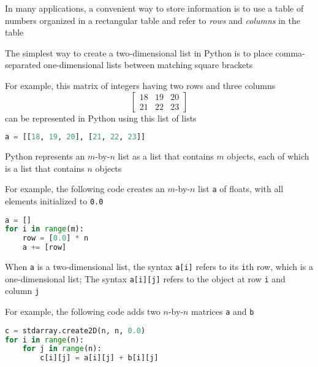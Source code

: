 \documentclass[8pt,a4paper,compress]{beamer}
\begin{document}
\begin{frame}[fragile]
In many applications, a convenient way to store information is to use a table of numbers organized in a rectangular table and refer to \emph{rows} and \emph{columns} in the table

\bigskip

The simplest way to create a two-dimensional list in Python is to place comma-separated one-dimensional lists between matching square brackets 

\bigskip

For example, this matrix of integers having two rows and three columns 
\[
\begin{bmatrix}
18 & 19 & 20 \\ 
21 & 22 & 23
\end{bmatrix}
\]
can be represented in Python using this list of lists
\begin{lstlisting}[language=Python]
a = [[18, 19, 20], [21, 22, 23]]
\end{lstlisting}

\bigskip

Python represents an $m$-by-$n$ list as a list that contains $m$ objects, each of which is a list that contains $n$ objects

\bigskip

For example, the following code creates an $m$-by-$n$ list \lstinline{a} of floats, with all elements initialized to \lstinline{0.0}
\begin{lstlisting}[language=Python]
a = []
for i in range(m):
    row = [0.0] * n
    a += [row]
\end{lstlisting}
\end{frame}

\begin{frame}[fragile]
When \lstinline{a} is a two-dimensional list, the syntax \lstinline{a[i]} refers to its \lstinline{i}th row, which is a one-dimensional list; The syntax \lstinline{a[i][j]} refers to the object at row \lstinline{i} and column \lstinline{j}

\bigskip

For example, the following code adds two $n$-by-$n$ matrices \lstinline{a} and \lstinline{b}

\begin{lstlisting}[language=Python]
c = stdarray.create2D(n, n, 0.0)
for i in range(n):
    for j in range(n):
        c[i][j] = a[i][j] + b[i][j]
\end{lstlisting}
\end{frame}
\end{document}
